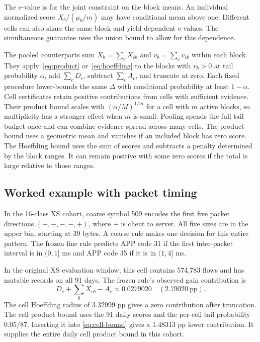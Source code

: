 \documentclass[preprint,11pt]{elsarticle}
\begin{document}
The e-value is for the joint constraint on the block means. An individual normalized score $X_b/(\mu_0/m)$ may have conditional mean above one. Different cells can also share the same block and yield dependent e-values. The simultaneous guarantee uses the union bound to allow for this dependence.

The pooled counterparts sum \mbox{$X_b=\sum\nolimits_c X_{cb}$} and \mbox{$v_b=\sum\nolimits_c v_{cb}$} within each block. They apply~\eqref{eq:product} or~\eqref{eq:hoeffding} to the blocks with $v_b>0$ at tail probability $\alpha$, add \mbox{$\sum\nolimits_c D_c$}, subtract \mbox{$\sum\nolimits_c A_c$}, and truncate at zero. Each fixed procedure lower-bounds the same $\Delta$ with conditional probability at least $1-\alpha$. Cell certificates retain positive contributions from cells with sufficient evidence. Their product bound scales with $(\alpha/M)^{1/m}$ for a cell with $m$ active blocks, so multiplicity has a stronger effect when $m$ is small. Pooling spends the full tail budget once and can combine evidence spread across many cells. The product bound uses a geometric mean and vanishes if an included block has zero score. The Hoeffding bound uses the sum of scores and subtracts a penalty determined by the block ranges. It can remain positive with some zero scores if the total is large relative to those ranges.

\subsection{Worked example with packet timing}
\label{sec:worked-example}

In the 16-class XS cohort, coarse symbol 509 encodes the first five packet directions $(+,-,-,-,+)$, where $+$ is client to server. All five sizes are in the upper bin, starting at 39 bytes. A coarse rule makes one decision for this entire pattern. The frozen fine rule predicts APP code 31 if the first inter-packet interval is in $(0,1]$ ms and APP code 35 if it is in $(1,4]$ ms.

In the original XS evaluation window, this cell contains 574{,}783 flows and has mutable records on all 91 days. The frozen rule's observed gain contribution is
\[
 D_c+\sum_b X_{cb}-A_c\approx 0.0279020 \quad (2.79020\ \text{pp}).
\]
The cell Hoeffding radius of 3.32999 pp gives a zero contribution after truncation. The cell product bound uses the 91 daily scores and the per-cell tail probability $0.05/87$. Inserting it into \eqref{eq:cell-bound} gives a 1.48313 pp lower contribution. It supplies the entire daily cell product bound in this cohort.
\end{document}
